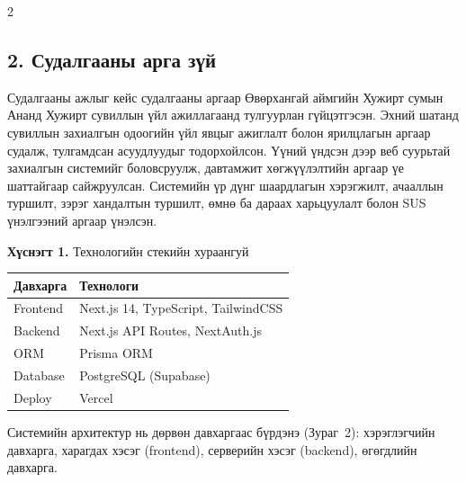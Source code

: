 \begin{multicols}{2}
\subsection*{2. Судалгааны арга зүй}

Судалгааны ажлыг кейс судалгааны аргаар Өвөрхангай аймгийн Хужирт сумын Ананд Хужирт сувиллын үйл ажиллагаанд тулгуурлан гүйцэтгэсэн. Эхний шатанд сувиллын захиалгын одоогийн үйл явцыг ажиглалт болон ярилцлагын аргаар судалж, тулгамдсан асуудлуудыг тодорхойлсон. Үүний үндсэн дээр веб суурьтай захиалгын системийг боловсруулж, давтамжит хөгжүүлэлтийн аргаар үе шаттайгаар сайжруулсан. Системийн үр дүнг шаардлагын хэрэгжилт, ачааллын туршилт, зэрэг хандалтын туршилт, өмнө ба дараах харьцуулалт болон SUS үнэлгээний аргаар үнэлсэн.

\begin{center}
\small
\textbf{Хүснэгт 1.} Технологийн стекийн хураангуй\\[4pt]
\begin{tabular}{|l|l|}
  \hline
  \textbf{Давхарга} & \textbf{Технологи} \\
  \hline
  Frontend  & Next.js 14, TypeScript, TailwindCSS \\
  Backend   & Next.js API Routes, NextAuth.js \\
  ORM       & Prisma ORM \\
  Database  & PostgreSQL (Supabase) \\
  Deploy    & Vercel \\
  \hline
\end{tabular}
\end{center}

Системийн архитектур нь дөрвөн давхаргаас бүрдэнэ (Зураг~2): хэрэглэгчийн давхарга, харагдах хэсэг (frontend), серверийн хэсэг (backend), өгөгдлийн давхарга.

\begin{center}
\end{center}


\end{multicols}
